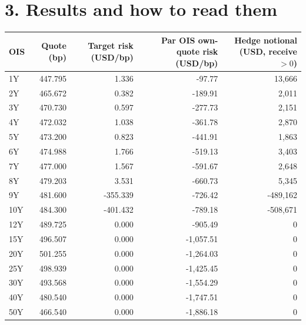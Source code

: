 \documentclass[10pt]{article}
\begin{document}
\section*{3. Results and how to read them}
\begin{center}\footnotesize
\begin{tabular}{@{}lrrrr@{}}\toprule
OIS & Quote (bp) & Target risk (USD/bp) & Par OIS own-quote risk (USD/bp) & Hedge notional (USD, receive $>0$) \\ \midrule
1Y & 447.795 & 1.336 & -97.77 & 13,666 \\
2Y & 465.672 & 0.382 & -189.91 & 2,011 \\
3Y & 470.730 & 0.597 & -277.73 & 2,151 \\
4Y & 472.032 & 1.038 & -361.78 & 2,870 \\
5Y & 473.200 & 0.823 & -441.91 & 1,863 \\
6Y & 474.988 & 1.766 & -519.13 & 3,403 \\
7Y & 477.000 & 1.567 & -591.67 & 2,648 \\
8Y & 479.203 & 3.531 & -660.73 & 5,345 \\
9Y & 481.600 & -355.339 & -726.42 & -489,162 \\
10Y & 484.300 & -401.432 & -789.18 & -508,671 \\
12Y & 489.725 & 0.000 & -905.49 & 0 \\
15Y & 496.507 & 0.000 & -1,057.51 & 0 \\
20Y & 501.255 & 0.000 & -1,264.03 & 0 \\
25Y & 498.939 & 0.000 & -1,425.45 & 0 \\
30Y & 493.568 & 0.000 & -1,554.29 & 0 \\
40Y & 480.540 & 0.000 & -1,747.51 & 0 \\
50Y & 466.540 & 0.000 & -1,886.18 & 0 \\
\bottomrule\end{tabular}\end{center}
\end{document}
